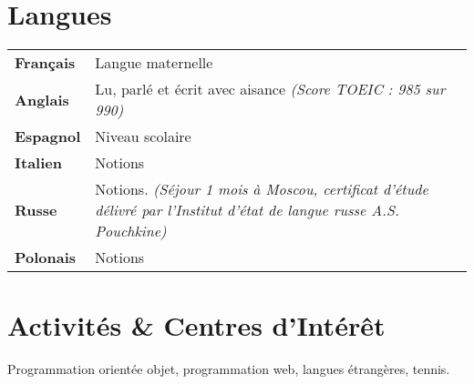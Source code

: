 \documentclass[10pt, a4paper]{article}
\begin{document}
\section{Langues}
\begin{tabu} to 
	\textbf{Français} & Langue maternelle\\
	\textbf{Anglais} & Lu, parlé et écrit avec aisance \em (Score TOEIC : 985 sur 990)\\
	\textbf{Espagnol} & Niveau scolaire\\
	\textbf{Italien} & Notions\\
	\textbf{Russe} & Notions. \em (Séjour 1 mois à Moscou, certificat d'étude délivré par l'Institut d'état de langue russe A.S. Pouchkine)\\
	\textbf{Polonais} & Notions
\end{tabu}
\vspace{0.1cm}


\section{Activités \& Centres d'Intérêt}
Programmation orientée objet, programmation web, langues étrangères, tennis.
\end{document}
